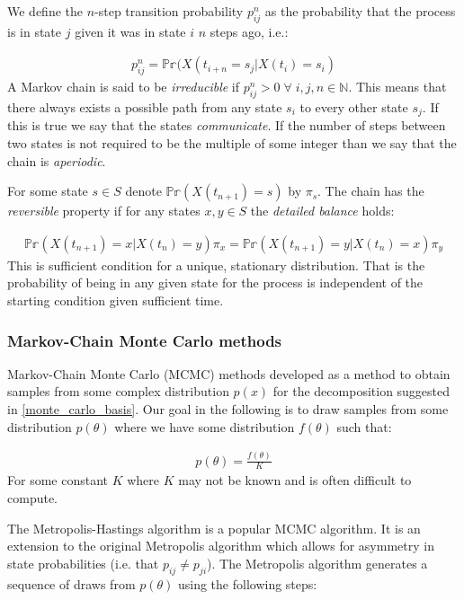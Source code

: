 \documentclass[11pt]{article} %
\begin{document}
We define the $n$-step transition probability $p_{ij}^n$ as the probability that the process is in state $j$ given it was in state $i$ $n$ steps ago, i.e.:

\begin{align}
p_{ij}^n = \mathbb{Pr}(X(t_{i+n} = s_j | X(t_i) = s_i)
\end{align}
A Markov chain is said to be \emph{irreducible} if $p_{ij}^n > 0 \; \forall \; i,j,n \in \mathbb{N}$. This means that there always exists a possible path from any state $s_i$ to every other state $s_j$. If this is true we say that the states \emph{communicate}. If the number of steps between two states is not required to be the multiple of some integer than we say that the chain is \emph{aperiodic}.

For some state $s \in S$ denote $ \mathbb{Pr}(X(t_{n+1}) = s)$ by $\pi_s$. The chain has the \emph{reversible} property if for any states $x, y \in S$ the \emph{detailed balance} holds:

\begin{align}
 \mathbb{Pr}(X(t_{n+1}) = x | X(t_n) = y)  \pi_x  =  \mathbb{Pr}(X(t_{n+1}) = y | X(t_n) = x) \pi_y
\end{align}
This is sufficient condition for a unique, stationary distribution. That is the probability of being in any given state for the process is independent of the starting condition given sufficient time.

\subsubsection{Markov-Chain Monte Carlo methods}
Markov-Chain Monte Carlo (MCMC) methods developed as a method to obtain samples from some complex distribution $p(x)$ for the decomposition suggested in \eqref{monte_carlo_basis}. Our goal in the following is to draw samples from some distribution $p(\theta)$ where we have some distribution $f(\theta)$ such that:

\begin{align}
p(\theta) = \frac{f(\theta)}{K} 
\end{align}
For some constant $K$ where $K$ may not be known and is often difficult to compute.

The Metropolis-Hastings algorithm \cite{HastingsMonteCarloSampling} is a popular MCMC algorithm. It is an extension to the original Metropolis algorithm which allows for asymmetry in state probabilities (i.e. that $p_{ij} \neq p_{ji}$). The Metropolis algorithm \cite{MetropolisMonteCarloMethod1949} \cite{MetropolisEquationStateCalculations1953} generates a sequence of draws from $p(\theta)$ using the following steps:
\end{document}

